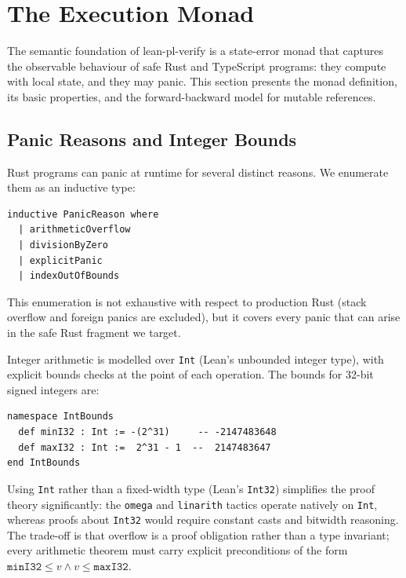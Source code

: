 
\section{The Execution Monad}
\label{sec:monad}

The semantic foundation of lean-pl-verify is a state-error monad that captures
the observable behaviour of safe Rust and TypeScript programs: they compute
with local state, and they may panic. This section presents the monad
definition, its basic properties, and the forward-backward model for mutable
references.

\subsection{Panic Reasons and Integer Bounds}
\label{sec:types}

Rust programs can panic at runtime for several distinct reasons. We enumerate
them as an inductive type:

\begin{lstlisting}[caption={PanicReason inductive type.},label={lst:panic}]
inductive PanicReason where
  | arithmeticOverflow
  | divisionByZero
  | explicitPanic
  | indexOutOfBounds
\end{lstlisting}

This enumeration is not exhaustive with respect to production Rust (stack
overflow and foreign panics are excluded), but it covers every panic that
can arise in the safe Rust fragment we target.

Integer arithmetic is modelled over \texttt{Int} (Lean's unbounded integer
type), with explicit bounds checks at the point of each operation. The bounds
for 32-bit signed integers are:

\begin{lstlisting}[caption={Integer bounds.},label={lst:bounds}]
namespace IntBounds
  def minI32 : Int := -(2^31)     -- -2147483648
  def maxI32 : Int :=  2^31 - 1  --  2147483647
end IntBounds
\end{lstlisting}

Using \texttt{Int} rather than a fixed-width type (\eg Lean's \texttt{Int32})
simplifies the proof theory significantly: the \texttt{omega} and \texttt{linarith}
tactics operate natively on \texttt{Int}, whereas proofs about \texttt{Int32}
would require constant casts and bitwidth reasoning. The trade-off is that
overflow is a proof obligation rather than a type invariant; every arithmetic
theorem must carry explicit preconditions of the form
$\texttt{minI32} \le v \wedge v \le \texttt{maxI32}$.

